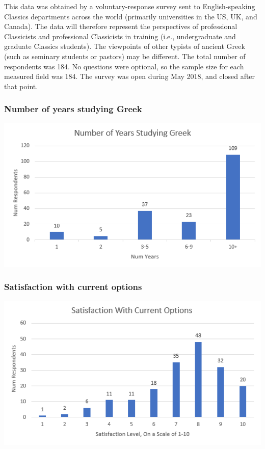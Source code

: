 \documentclass[11pt]{article}
\begin{document}
This data was obtained by a voluntary-response survey sent to English-speaking Classics departments across the world (primarily universities in the US, UK, and Canada). The data will therefore represent the perspectives of professional Classicists and professional Classicists in training (i.e., undergraduate and graduate Classics students). The viewpoints of other typists of ancient Greek (such as seminary students or pastors) may be different. The total number of respondents was 184. No questions were optional, so the sample size for each measured field was 184. The survey was open during May 2018, and closed after that point.

\subsubsection{Number of years studying Greek}
\label{sec:orgf861324}

\begin{center}
\includegraphics[width=.9\linewidth]{./images/years-studied.PNG}
\end{center}

\subsubsection{Satisfaction with current options}
\label{sec:org4277b2f}

\begin{center}
\includegraphics[width=.9\linewidth]{./images/satisfaction.PNG}
\end{center}
\end{document}
